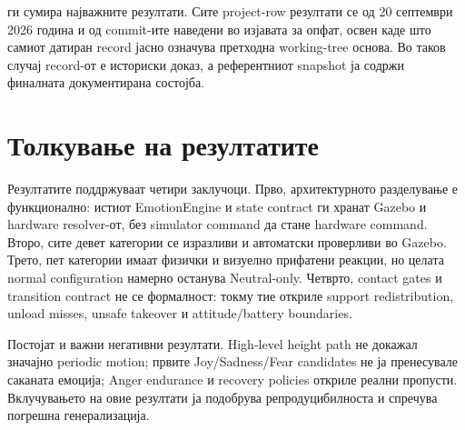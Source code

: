  ги сумира најважните резултати. Сите project-row
резултати се од 20 септември 2026 година и од commit-ите наведени во изјавата
за опфат, освен каде што самиот датиран record јасно означува претходна
working-tree основа. Во таков случај record-от е историски доказ, а референтниот
snapshot ја содржи финалната документирана состојба.



\section{Толкување на резултатите}

Резултатите поддржуваат четири заклучоци. Прво, архитектурното разделување е
функционално: истиот EmotionEngine и state contract ги хранат Gazebo и
hardware resolver-от, без simulator command да стане hardware command. Второ,
сите девет категории се изразливи и автоматски проверливи во Gazebo. Трето,
пет категории имаат физички и визуелно прифатени реакции, но целата normal
configuration намерно останува Neutral-only. Четврто, contact gates и
transition contract не се формалност: токму тие откриле support redistribution,
unload misses, unsafe takeover и attitude/battery boundaries.

Постојат и важни негативни резултати. High-level height path не докажал
значајно periodic motion; првите Joy/Sadness/Fear candidates не ја пренесувале
саканата емоција; Anger endurance и recovery policies откриле реални пропусти.
Вклучувањето на овие резултати ја подобрува репродуцибилноста и спречува
погрешна генерализација.
